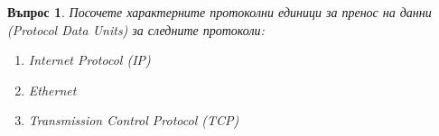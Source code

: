 \documentclass[11pt]{scrartcl}
\newtheorem{q}{Въпрос}
\newenvironment{defractors}{
\begin{enumerate}
  \setlength{\itemsep}{1pt}
  \setlength{\parskip}{0pt}
  \setlength{\parsep}{0pt}
}{\end{enumerate}}
\begin{document}
\begin{q}
  Посочете характерните протоколни единици за пренос на данни (Protocol Data
  Units) за следните протоколи:

  \begin{defractors}
  \item Internet Protocol (IP)
  \item Ethernet
  \item Transmission Control Protocol (TCP)
  \end{defractors}
\end{q}
\end{document}
